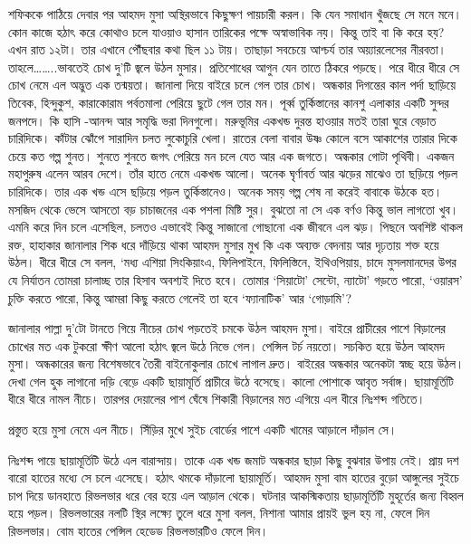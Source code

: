 \documentclass[
]{book}
\begin{document}
শফিককে পাঠিয়ে দেবার পর আহমদ মুসা অস্থিরভাবে কিছুক্ষণ পায়চারী করল। কি যেন সমাধান খুঁজছে সে মনে মনে। কোন কাজে হঠাৎ করে কোথাও চলে যাওয়াও হাসান তারিকের পক্ষে অস্বাভাবিক নয়। কিন্তু তাই বা কি করে হয়? এখন রাত ১২টা। তার এখানে পৌঁছবার কথা ছিল ১১ টায়। তাছাড়া সবচেয়ে আশ্চর্য তার অয়্যারলেসের নীরবতা। তাহলে\ldots\ldots..ভাবতেই চোখ দু'টি জ্বলে উঠল মুসার। প্রতিশোধের আগুন যেন তাতে ঠিকরে পড়ছে। পরে ধীরে ধীরে সে চোখ নেমে এল অদ্ভুত এক তন্ময়তা। জানালা দিয়ে বাইরে চলে গেল তার চোখ। অন্ধকার দিগন্তের কাল পর্দা ছাড়িয়ে তিবেক, হিন্দুকুশ, কারাকোরাম পর্বতমালা পেরিয়ে ছুটে গেল তার মন। পূর্ব্ব তুর্কিস্তানের কানশু এলাকার একটি সুন্দর জনপদে। কি হাসি -আনন্দ আর সমৃদ্ধি ভরা দিনগুলো। মরুভূমির একখন্ড দুরন্ত হাওয়ার মতই তারা ঘুরে বেড়াত চারিদিকে। কাঁটার ঝোঁপে সারাদিন চলত লুকোচুরি খেলা। রাতের বেলা বাবার উষ্ণ কোলে বসে আকাশের তারার দিকে চেয়ে কত গল্প শুনত। শুনতে শুনতে জগৎ পেরিয়ে মন চলে যেত আর এক জগতে। অন্ধকার গোটা পৃথিবী। একজন মহাপুরুষ এলেন আরব দেশে। তাঁর হাতে নেমে একখন্ড আলো। অনেক ঘৃর্ণাবর্ত আর ঝড়ের মাঝেও তা ছড়িয়ে পড়ল চারিদিকে। তার এক খন্ড এসে ছড়িয়ে পড়ল তুর্কিস্তানেও। অনেক সময় গল্প শেষ না করেই বাবাকে উঠকে হত। মসজিদ থেকে ভেসে আসতো বড় চাচাজনের এক পশলা মিষ্টি সুর। বুঝতো না সে এক বর্ণও কিন্তু ভাল লাগতো খুব। এমনি করে দিন চলে এসেছিল, চলতও এভাবেই কিন্তু সাজানো গোছানো এক জীবনে এল ঝড়। পিছনে অবশিষ্ট থাকল রক্ত, হাহাকার জানালার শিক ধরে দাঁড়িয়ে থাকা আহমদ মুসার মুখ কি এক অব্যক্ত বেদনায় আর দৃঢ়তায় শক্ত হয়ে উঠল। ধীরে ধীরে সে বলল, `মধ্য এশিয়া সিংকিয়াংএ, ফিলিপাইনে, ফিলিস্তিনে, ইথিওপিয়ায়, চাদে মুসলমানদের উপর যে নির্যাতন তোমরা চালাচ্ছ তার হিসাব অবশ্যই দিতে হবে। তোমার `সিয়াটো' সেন্টো, ন্যাটো' গড়তে পারো, `ওয়ারস' চুক্তি করতে পারো, কিন্তু আমরা কিছু করতে গেলেই তা হবে `ফ্যানাটিক' আর `গোড়ামি'?

জানালার পাল্লা দু'টো টানতে গিয়ে নীচের চোখ পড়তেই চমকে উঠল আহমদ মুসা। বাইরে প্রাচীরের পাশে বিড়ালের চোখের মত এক টুকরো ক্ষীণ আলো হঠাৎ জ্বলে উঠে নিভে গেল। পেন্সিল টর্চ নয়তো। সচকিত হয়ে উঠল আহমদ মুসা। অন্ধকারের জন্য বিশেষভাবে তৈরী বাইনোকুলার চোখে লাগাল দ্রুত। বাইরের অন্ধকার অনেকটা স্বচ্ছ হয়ে উঠল। দেখা গেল হুক লাগানো দড়ি বেড়ে একটি ছায়ামূর্তি প্রাচীরে উঠে বসেছে। কালো পোশাকে আবৃত সর্বাঙ্গ। ছায়ামূর্তিটি ধীরে ধীরে নামল নীচে। তারপর দেয়ালের পাশ ঘেঁষে শিকারী বিড়ালের মত এগিয়ে এল ধীরে নিঃশব্দ গতিতে।

প্রস্তুত হয়ে মুসা নেমে এল নীচে। সিঁড়ির মুখে সুইচ বোর্ডের পাশে একটি খামের আড়ালে দাঁড়াল সে।

নিঃশব্দ পায়ে ছায়ামূর্তিটি উঠে এল বারান্দায়। তাকে এক খন্ড জমাট অন্ধকার ছাড়া কিছু বুঝবার উপায় নেই। প্রায় দশ বারো হাতের মধ্যে সে চলে এসেছে। হঠাৎ থমকে দাঁড়ালো ছায়ামূর্তি। আহমদ মুসা বাম হাতের বুড়ো আঙ্গুলের সুইচে চাপ দিয়ে ডানহাতে রিভলভার ধরে বের হয়ে এল আড়াল থেকে। ঘটনার আকস্মিকতায় ছাড়ামূর্তিটি মুহূর্তের জন্য বিহ্বল হয়ে পড়ল। রিভলভারের নলটি স্থির লক্ষ্যে তুলে ধরে মুসা বলল, নিশানা আমার প্রায়ই ভুল হয় না, ফেলে দিন রিভলভার। বোম হাতের পেন্সিল হেডেড রিভলভারটিও ফেলে দিন।
\end{document}
